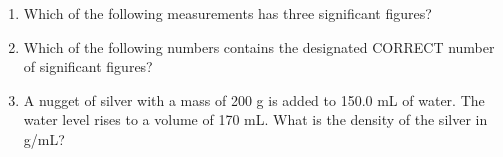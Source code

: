 \documentclass[main.tex]{subfiles}
\begin{document}
\pagestyle{style2}
\setlength{\parskip}{0.5em}
\begin{fullwidth}
\begin{multicols*}{2}\begin{enumerate}  \setlength\itemsep{0.2em}





\item Which of the following measurements has three significant figures? 
\begin{enumerate}[label=(\alph*)]\vspace{-0.5cm}
\end{enumerate}\vspace{-0.5cm}

\item Which of the following numbers contains the designated CORRECT number of significant figures? 
\begin{enumerate}[label=(\alph*)]\vspace{-0.5cm}
\end{enumerate}\vspace{-0.5cm}

\item A nugget of silver with a mass of 200 g is added to 150.0 mL of water.  The water level rises to a volume of 170 mL.  What is the density of the silver in g/mL? 
\begin{enumerate}[label=(\alph*)]\vspace{-0.5cm}
\end{enumerate}\vspace{-0.5cm}


\end{enumerate}
\end{multicols*}
\end{fullwidth}
\end{document}
